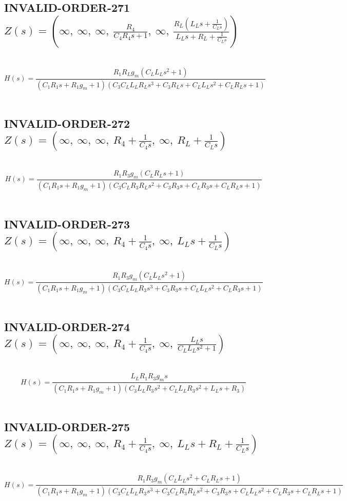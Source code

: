 \documentclass{article}
\begin{document}
\subsection{INVALID-ORDER-271 $Z(s) = \left( \infty, \  \infty, \  \infty, \  \frac{R_{4}}{C_{4} R_{4} s + 1}, \  \infty, \  \frac{R_{L} \left(L_{L} s + \frac{1}{C_{L} s}\right)}{L_{L} s + R_{L} + \frac{1}{C_{L} s}}\right)$ } \ 
\textbf{\[H(s) = \frac{R_{1} R_{L} g_{m} \left(C_{L} L_{L} s^{2} + 1\right)}{\left(C_{1} R_{1} s + R_{1} g_{m} + 1\right) \left(C_{3} C_{L} L_{L} R_{L} s^{3} + C_{3} R_{L} s + C_{L} L_{L} s^{2} + C_{L} R_{L} s + 1\right)}\] } \ 
\subsection{INVALID-ORDER-272 $Z(s) = \left( \infty, \  \infty, \  \infty, \  R_{4} + \frac{1}{C_{4} s}, \  \infty, \  R_{L} + \frac{1}{C_{L} s}\right)$ } \ 
\textbf{\[H(s) = \frac{R_{1} R_{3} g_{m} \left(C_{L} R_{L} s + 1\right)}{\left(C_{1} R_{1} s + R_{1} g_{m} + 1\right) \left(C_{3} C_{L} R_{3} R_{L} s^{2} + C_{3} R_{3} s + C_{L} R_{3} s + C_{L} R_{L} s + 1\right)}\] } \ 
\subsection{INVALID-ORDER-273 $Z(s) = \left( \infty, \  \infty, \  \infty, \  R_{4} + \frac{1}{C_{4} s}, \  \infty, \  L_{L} s + \frac{1}{C_{L} s}\right)$ } \ 
\textbf{\[H(s) = \frac{R_{1} R_{3} g_{m} \left(C_{L} L_{L} s^{2} + 1\right)}{\left(C_{1} R_{1} s + R_{1} g_{m} + 1\right) \left(C_{3} C_{L} L_{L} R_{3} s^{3} + C_{3} R_{3} s + C_{L} L_{L} s^{2} + C_{L} R_{3} s + 1\right)}\] } \ 
\subsection{INVALID-ORDER-274 $Z(s) = \left( \infty, \  \infty, \  \infty, \  R_{4} + \frac{1}{C_{4} s}, \  \infty, \  \frac{L_{L} s}{C_{L} L_{L} s^{2} + 1}\right)$ } \ 
\textbf{\[H(s) = \frac{L_{L} R_{1} R_{3} g_{m} s}{\left(C_{1} R_{1} s + R_{1} g_{m} + 1\right) \left(C_{3} L_{L} R_{3} s^{2} + C_{L} L_{L} R_{3} s^{2} + L_{L} s + R_{3}\right)}\] } \ 
\subsection{INVALID-ORDER-275 $Z(s) = \left( \infty, \  \infty, \  \infty, \  R_{4} + \frac{1}{C_{4} s}, \  \infty, \  L_{L} s + R_{L} + \frac{1}{C_{L} s}\right)$ } \ 
\textbf{\[H(s) = \frac{R_{1} R_{3} g_{m} \left(C_{L} L_{L} s^{2} + C_{L} R_{L} s + 1\right)}{\left(C_{1} R_{1} s + R_{1} g_{m} + 1\right) \left(C_{3} C_{L} L_{L} R_{3} s^{3} + C_{3} C_{L} R_{3} R_{L} s^{2} + C_{3} R_{3} s + C_{L} L_{L} s^{2} + C_{L} R_{3} s + C_{L} R_{L} s + 1\right)}\] } \ 
\end{document}
